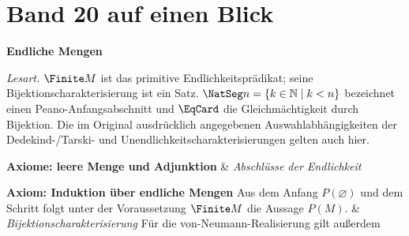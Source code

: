 \chapter[Band 20: Endliche Mengen]{Band 20 auf einen Blick}
\noindent\textbf{Endliche Mengen}\par\medskip
\noindent\emph{Lesart.}
\(\Finite M\) ist das primitive Endlichkeitsprädikat; seine
Bijektionscharakterisierung ist ein Satz.
\(\NatSeg n=\{k\in\mathbb N\mid k<n\}\) bezeichnet einen
Peano-Anfangsabschnitt und \(\EqCard\) die Gleichmächtigkeit durch Bijektion.
Die im Original ausdrücklich angegebenen Auswahlabhängigkeiten der
Dedekind-/Tarski- und Unendlichkeitscharakterisierungen gelten auch hier.

\begin{BandUebersicht}
\textbf{Axiome: leere Menge und Adjunktion}
&
\textit{Abschlüsse der Endlichkeit}
\\ \addlinespace[.8ex]

\textbf{Axiom: Induktion über endliche Mengen}
Aus dem Anfang \(P(\varnothing)\) und dem Schritt
folgt unter der Voraussetzung \(\Finite M\) die Aussage \(P(M)\).
&
\textit{Bijektionscharakterisierung}
Für die von-Neumann-Realisierung gilt außerdem
\\ \addlinespace[.8ex]


\end{BandUebersicht}
